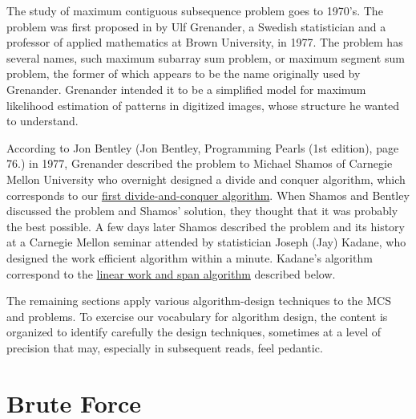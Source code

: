 \begin{cluster}
\label{grp:not:mcss::introduction::mcss-history}

\begin{note}
\label{not:mcss::introduction::mcss-history}

The study of  maximum contiguous subsequence problem goes to 1970's.  
The problem was first proposed in by Ulf Grenander, a Swedish
statistician and a professor of applied mathematics at Brown
University, in 1977.
The problem has several names, such maximum subarray sum problem, or
maximum segment sum problem, the former of which appears to be the
name originally used by Grenander.
Grenander intended it to be a simplified model for maximum likelihood
estimation of patterns in digitized images, whose structure he wanted
to understand.


According to Jon Bentley
(Jon Bentley, Programming Pearls (1st edition), page 76.)
in 1977, Grenander described the problem to Michael Shamos of
Carnegie Mellon University who overnight designed a divide and
conquer algorithm, which corresponds to our 
\href{alg:mcss::dc::first}{first divide-and-conquer algorithm}.
When Shamos and Bentley discussed the problem and Shamos' solution,
they thought that it was probably the best possible.
A few days later Shamos described the problem and its history at a
Carnegie Mellon seminar attended by statistician Joseph (Jay) Kadane,
who designed the work efficient algorithm within a minute.
Kadane's algorithm correspond to the 
\href{alg:mcs::iterative}{linear work and span algorithm} 
described below.

\end{note}
\end{cluster}

\begin{cluster}
\label{grp:gr:mcss::problem::roadmap}

\begin{gram}[Roadmap]
\label{gr:mcss::problem::roadmap}
The remaining sections apply various algorithm-design
techniques to the MCS and \MCSS{} problems.
To exercise our vocabulary for algorithm design, the content is
organized to identify carefully the design techniques, sometimes at a
level of precision that may, especially in subsequent reads, feel
pedantic.

\end{gram}
\end{cluster}


\section{Brute Force}
\label{sec:mcss::bf}

